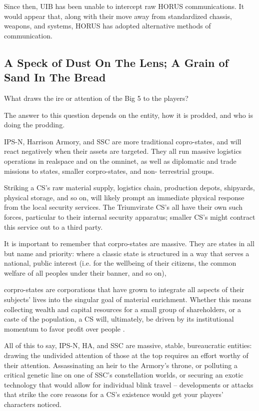 Since then, UIB has been unable to intercept raw HORUS communications. It would appear
that, along with their move away from standardized chassis, weapons, and systems, HORUS
has adopted alternative methods of communication.

\subsection{A Speck of Dust On The Lens; A Grain of Sand In The Bread}

What draws the ire or attention of the Big 5 to the players?

The answer to this question depends on the entity, how it is prodded, and who is doing the
prodding.

IPS-N, Harrison Armory, and SSC are more traditional copro-states, and will react negatively
when their assets are targeted. They all run massive logistics operations in realspace and on the
omninet, as well as diplomatic and trade missions to states, smaller corpro-states, and non-
terrestrial groups.

Striking a CS’s raw material supply, logistics chain, production depots, shipyards, physical
storage, and so on, will likely prompt an immediate physical response from the local security
services. The Triumvirate CS’s all have their own such forces, particular to their internal security
apparatus; smaller CS’s might contract this service out to a third party.

It is important to remember that corpro-states are massive. They are states in all but name and
priority: where a classic state is structured in a way that serves a national, public interest (i.e. for
the wellbeing of their citizens, the common welfare of all peoples under their banner, and so on),




corpro-states are corporations that have grown to integrate all aspects of their subjects’ lives into
the singular goal of material enrichment. Whether this means collecting wealth and capital
resources for a small group of shareholders, or a caste of the population, a CS will, ultimately, be
driven by its institutional momentum to favor profit over people .

All of this to say, IPS-N, HA, and SSC are massive, stable, bureaucratic entities: drawing the
undivided attention of those at the top requires an effort worthy of their attention. Assassinating an
heir to the Armory’s throne, or polluting a critical genetic line on one of SSC’s constellation worlds,
or securing an exotic technology that would allow for individual blink travel -- developments or
attacks that strike the core reasons for a CS’s existence would get your players’ characters
noticed.

